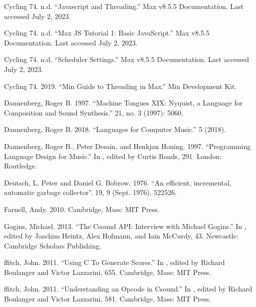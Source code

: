 \documentclass[letterpaper,10pt,english]{sphinxmanual}
\begin{document}
\sphinxAtStartPar
Cycling 74. n.d. “Javascript and Threading.”  Max v8.5.5 Documentation. Last accessed July 2, 2023. 

\sphinxAtStartPar
Cycling 74. n.d. “Max JS Tutorial 1: Basic JavaScript.”  Max v8.5.5 Documentation. Last accessed July 2, 2023. 

\sphinxAtStartPar
Cycling 74. n.d. “Scheduler Settings.” Max v8.5.5 Documentation. Last accessed July 2, 2023. 

\sphinxAtStartPar
Cycling 74. 2019. “Min Guide to Threading in Max.” Min Development Kit. 

\sphinxAtStartPar
Dannenberg, Roger B. 1997. “Machine Tongues XIX: Nyquist, a Language for Composition and Sound Synthesis.”  21, no. 3 (1997): 50\textendash{}60.

\sphinxAtStartPar
Dannenberg, Roger B. 2018. “Languages for Computer Music.”  5 (2018).

\sphinxAtStartPar
Dannenberg, Roger B., Peter Desain, and Henkjan Honing. 1997. “Programming Language Design for Music.” In , edited by Curtis Roads, 291. London: Routledge.

\sphinxAtStartPar
Deutsch, L. Peter and Daniel G. Bobrow. 1976. “An efficient, incremental, automatic garbage collector”.  19, 9 (Sept. 1976), 522\textendash{}526.

\sphinxAtStartPar
Farnell, Andy. 2010.  Cambridge, Mass: MIT Press.

\sphinxAtStartPar
Gogins, Michael. 2013. “The Csound API: Interview with Michael Gogins.” In , edited by Joachim Heintz, Alex Hofmann, and Iain McCurdy, 43. Newcastle: Cambridge Scholars Publishing.

\sphinxAtStartPar
ffitch, John. 2011. “Using C To Generate Scores.” In , edited by Richard Boulanger and Victor Lazzarini, 655. Cambridge, Mass: MIT Press.

\sphinxAtStartPar
ffitch, John. 2011. “Understanding an Opcode in Csound.” In , edited by Richard Boulanger and Victor Lazzarini, 581. Cambridge, Mass: MIT Press.
\end{document}
